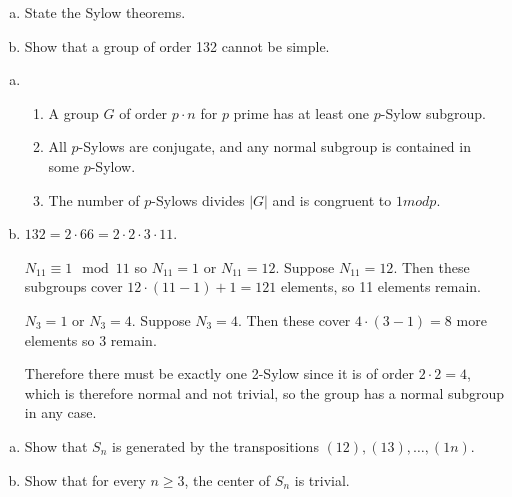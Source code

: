 \documentclass{article}
\newcounter{Problem}
\newenvironment{Problem}{\begin{Exercise}[name={Problem},
                                          counter={Problem}]}
                        {\end{Exercise}}
\begin{document}
\begin{Problem}
\begin{enumerate}[(a)]
  \item{State the Sylow theorems.}
  \item{Show that a group of order 132 cannot be simple.}
\end{enumerate}
\end{Problem}

\begin{Answer}
\begin{enumerate}[(a)]
  \item{
    \begin{enumerate}
      \item{A group $G$ of order $p \cdot n$ for $p$ prime has at
            least one $p$-Sylow subgroup.
           }
      \item{All $p$-Sylows are conjugate, and any normal subgroup is
            contained in some $p$-Sylow.
           }
      \item{The number of $p$-Sylows divides $|G|$ and is congruent to
            $1 mod p$.
           }
    \end{enumerate}
  }
  \item{
    $132 = 2 \cdot 66 = 2 \cdot 2 \cdot 3 \cdot 11$.

    $N_{11} \equiv 1 \mod 11$ so $N_{11} = 1$ or $N_{11} =
    12$. Suppose $N_{11} = 12$. Then these subgroups cover
    $12 \cdot (11 - 1) + 1 = 121$ elements, so 11 elements remain.

    $N_3 = 1$ or $N_3 = 4$. Suppose $N_3 = 4$. Then these cover
    $4 \cdot (3 - 1) = 8$ more elements so 3 remain.

    Therefore there must be exactly one 2-Sylow since it is of order
    $2 \cdot 2 = 4$, which is therefore normal and not trivial, so
    the group has a normal subgroup in any case.
  }
\end{enumerate}
\end{Answer}

\begin{Problem}
\begin{enumerate}[(a)]
  \item{Show that $S_n$ is generated by the transpositions
        $(12), (13), \dots, (1n)$.
       }
  \item{Show that for every $n \geq 3$, the center of $S_n$ is trivial.}
\end{enumerate}
\end{Problem}
\end{document}
